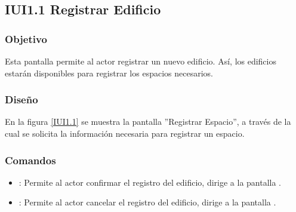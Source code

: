 \subsection{IUI1.1 Registrar Edificio}

\subsubsection{Objetivo}
	Esta pantalla permite al actor registrar un nuevo edificio. Así, los edificios estarán disponibles para registrar los espacios necesarios.

\subsubsection{Diseño}
    En la figura \ref{IUI1.1} se muestra la pantalla ''Registrar Espacio'', a través de la cual se solicita la información necesaria para registrar un espacio.
 

\subsubsection{Comandos}
    \begin{itemize}
	\item {}: Permite al actor confirmar el registro del edificio, dirige a la pantalla .
	
	\item {}: Permite al actor cancelar el registro del edificio, dirige a la pantalla .
    \end{itemize}
